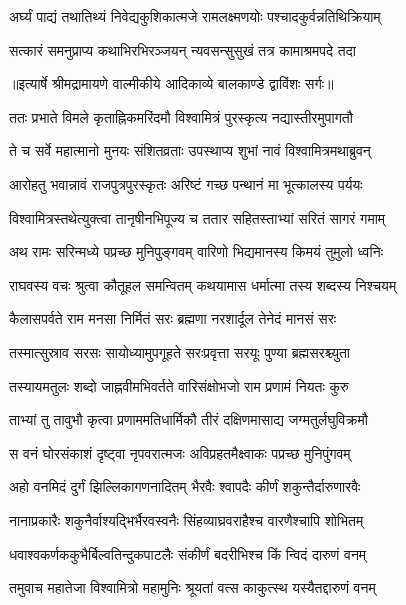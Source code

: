 \twolineshloka
{अर्घ्यं पाद्यं तथातिथ्यं निवेद्यकुशिकात्मजे}
{रामलक्ष्मणयोः पश्चादकुर्वन्नतिथिक्रियाम्} %

\twolineshloka
{सत्कारं समनुप्राप्य कथाभिरभिरञ्जयन्}
{न्यवसन्सुसुखं तत्र कामाश्रमपदे तदा} %


{॥इत्यार्षे श्रीमद्रामायणे वाल्मीकीये आदिकाव्ये बालकाण्डे द्वाविंशः सर्गः॥}


\twolineshloka
{ततः प्रभाते विमले कृताह्निकमरिंदमौ}
{विश्वामित्रं पुरस्कृत्य नद्यास्तीरमुपागतौ} %

\twolineshloka
{ते च सर्वे महात्मानो मुनयः संशितव्रताः}
{उपस्थाप्य शुभां नावं विश्वामित्रमथाब्रुवन्} %

\twolineshloka
{आरोहतु भवान्नावं राजपुत्रपुरस्कृतः}
{अरिष्टं गच्छ पन्थानं मा भूत्कालस्य पर्ययः} %

\twolineshloka
{विश्वामित्रस्तथेत्युक्त्वा तानृषीनभिपूज्य च}
{ततार सहितस्ताभ्यां सरितं सागरं गमाम्} %

\twolineshloka
{अथ रामः सरिन्मध्ये पप्रच्छ मुनिपुङ्गवम्}
{वारिणो भिद्यमानस्य किमयं तुमुलो ध्वनिः} %

\twolineshloka
{राघवस्य वचः श्रुत्वा कौतूहल समन्वितम्}
{कथयामास धर्मात्मा तस्य शब्दस्य निश्चयम्} %

\twolineshloka
{कैलासपर्वते राम मनसा निर्मितं सरः}
{ब्रह्मणा नरशार्दूल तेनेदं मानसं सरः} %

\twolineshloka
{तस्मात्सुस्राव सरसः सायोध्यामुपगूहते}
{सरःप्रवृत्ता सरयूः पुण्या ब्रह्मसरश्च्युता} %

\twolineshloka
{तस्यायमतुलः शब्दो जाह्नवीमभिवर्तते}
{वारिसंक्षोभजो राम प्रणामं नियतः कुरु} %

\twolineshloka
{ताभ्यां तु तावुभौ कृत्वा प्रणाममतिधार्मिकौ}
{तीरं दक्षिणमासाद्य जग्मतुर्लघुविक्रमौ} %

\twolineshloka
{स वनं घोरसंकाशं दृष्ट्वा नृपवरात्मजः}
{अविप्रहतमैक्ष्वाकः पप्रच्छ मुनिपुंगवम्} %

\twolineshloka
{अहो वनमिदं दुर्गं झिल्लिकागणनादितम्}
{भैरवैः श्वापदैः कीर्णं शकुन्तैर्दारुणारवैः} %

\twolineshloka
{नानाप्रकारैः शकुनैर्वाश्यद्भिर्भैरवस्वनैः}
{सिंहव्याघ्रवराहैश्च वारणैश्चापि शोभितम्} %

\twolineshloka
{धवाश्वकर्णककुभैर्बिल्वतिन्दुकपाटलैः}
{संकीर्णं बदरीभिश्च किं न्विदं दारुणं वनम्} %

\twolineshloka
{तमुवाच महातेजा विश्वामित्रो महामुनिः}
{श्रूयतां वत्स काकुत्स्थ यस्यैतद्दारुणं वनम्} %


